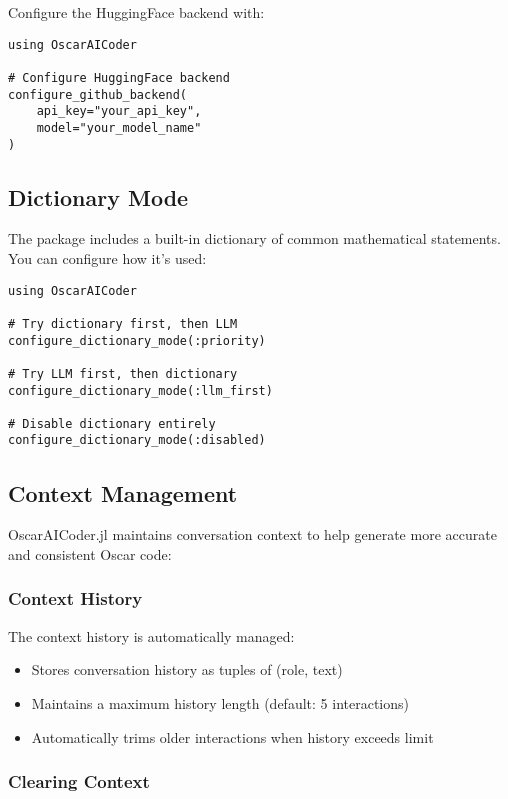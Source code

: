 \documentclass[11pt,a4paper]{article}
\begin{document}
Configure the HuggingFace backend with:

\begin{lstlisting}
using OscarAICoder

# Configure HuggingFace backend
configure_github_backend(
    api_key="your_api_key",
    model="your_model_name"
)
\end{lstlisting}

\subsection{Dictionary Mode}

The package includes a built-in dictionary of common mathematical statements. You can configure how it's used:

\begin{lstlisting}
using OscarAICoder

# Try dictionary first, then LLM
configure_dictionary_mode(:priority)

# Try LLM first, then dictionary
configure_dictionary_mode(:llm_first)

# Disable dictionary entirely
configure_dictionary_mode(:disabled)
\end{lstlisting}

\subsection{Context Management}

OscarAICoder.jl maintains conversation context to help generate more accurate and consistent Oscar code:

\subsubsection{Context History}

The context history is automatically managed:
\begin{itemize}
    \item Stores conversation history as tuples of (role, text)
    \item Maintains a maximum history length (default: 5 interactions)
    \item Automatically trims older interactions when history exceeds limit
\end{itemize}

\subsubsection{Clearing Context}
\end{document}
